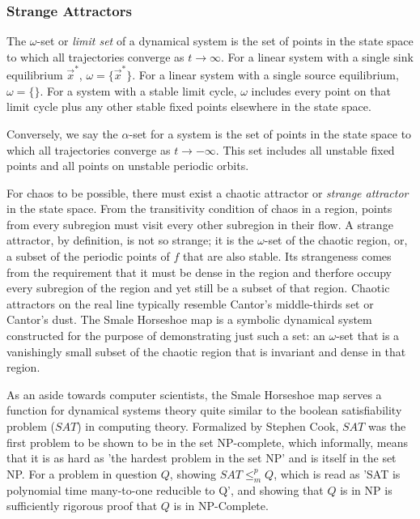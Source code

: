 \documentclass{elsart}
\begin{document}
\subsubsection{Strange Attractors}

The $\omega$-set or \textit{limit set} of a dynamical system is the set 
of points in the state
space to which all trajectories converge as $t \rightarrow \infty$.  For a 
linear system with a single sink equilibrium $\vec{x}^{*}$, 
$\omega=\{\vec{x}^{*}\}$.  For a linear system with a single source equilibrium,
$\omega=\{\}$.  For a system with a stable limit cycle, $\omega$ includes
every point on that limit cycle plus any other stable fixed points elsewhere
in the state space.  

Conversely, we say the $\alpha$-set for a system is the set of points
in the state space to which all trajectories converge as 
$t \rightarrow -\infty$.  This set includes all unstable fixed points and
all points on unstable periodic orbits.

For chaos to be possible, there must exist a chaotic attractor or 
\textit{strange attractor} in
the state space.  From the transitivity condition of chaos in a region, 
points from every subregion must visit every other subregion in their
flow.  A strange attractor, by definition, is not so strange; it is the
$\omega$-set of the chaotic region, or, a subset of the periodic points of $f$
that are also stable.  Its strangeness comes from the requirement that it
must be dense in the region and therfore occupy every subregion of the region
and yet still be a subset of that region.  
Chaotic attractors on the real line typically resemble Cantor's middle-thirds
set or Cantor's dust.
The Smale Horseshoe map is
a symbolic dynamical system constructed for the purpose of demonstrating 
just such a set:  an $\omega$-set that is a vanishingly small subset of 
the chaotic region that is invariant and dense in that region.

As an aside towards computer scientists, the Smale Horseshoe map serves
a function for dynamical systems theory quite similar to the 
boolean satisfiability problem ($SAT$) in computing theory.  Formalized by
Stephen Cook, $SAT$ was the first
problem to be shown to be in the set NP-complete, which informally, means that
it is as hard as 'the hardest problem in the set NP' and is itself in the set
NP.  For a problem in question $Q$, showing $SAT \leq_{m}^{p} Q$, which is 
read as 'SAT is polynomial time many-to-one reducible to Q', 
and showing that $Q$ is in NP is sufficiently 
rigorous proof that $Q$ is in NP-Complete.  
\end{document}

